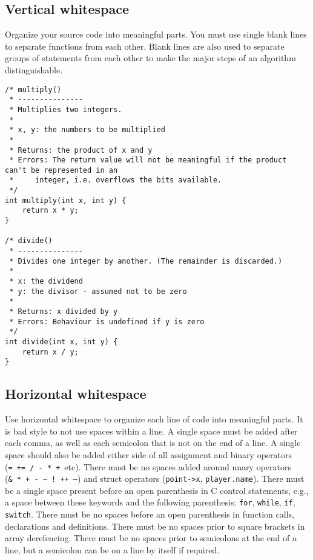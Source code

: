 \documentclass{article}
\newcommand{\propertilde}{\nolinkurl{~}}
\begin{document}
\subsection{Vertical whitespace}
Organize your source code into meaningful parts.
You must use single blank lines to separate functions from each other.
Blank lines are also used to separate groups of statements from each other to make the major steps of an algorithm distinguishable.

\begin{lstlisting}
/* multiply()
 * ---------------
 * Multiplies two integers.
 *
 * x, y: the numbers to be multiplied
 *
 * Returns: the product of x and y
 * Errors: The return value will not be meaningful if the product can't be represented in an 
 *     integer, i.e. overflows the bits available.
 */
int multiply(int x, int y) {
    return x * y;
}

/* divide()
 * ---------------
 * Divides one integer by another. (The remainder is discarded.)
 *
 * x: the dividend
 * y: the divisor - assumed not to be zero
 *
 * Returns: x divided by y 
 * Errors: Behaviour is undefined if y is zero
 */
int divide(int x, int y) {
    return x / y;
}
\end{lstlisting}

\subsection{Horizontal whitespace}
Use horizontal whitespace to organize each line of code into meaningful parts.
It is bad style to not use spaces within a line.
A single space must be added after each comma, as well as each semicolon that is not on the end of a line.
A single space should also be added either side of all assignment and binary operators (\texttt{=~+=~/~-~*~+}~etc).
There must be no spaces added around unary operators (\texttt{\&~*~+~-~\propertilde~!~++~--}) and struct operators (\texttt{point->x}, \texttt{player.name}). There must be a single space present before an open parenthesis in C control statements, e.g., a space between these keywords and the following parenthesis: \texttt{for}, \texttt{while}, 
\texttt{if}, \texttt{switch}. There must be no spaces before an open parenthesis in function calls, declarations and 
definitions. There must be no spaces prior to square brackets in array derefencing. There must be no spaces 
prior to semicolons at the end of a line, but a semicolon can be on a line by itself if required. 
\end{document}
